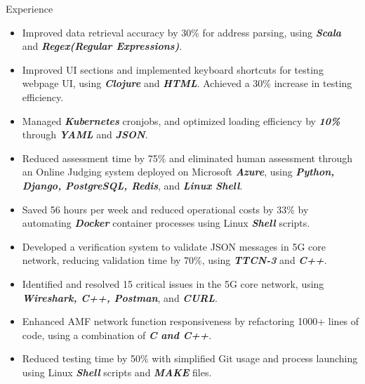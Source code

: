 \documentclass{resume} %
\begin{document}
\begin{workSection}{Experience}
\begin{itemize}
            \item Improved data retrieval accuracy by 30\% for address parsing, using \textit{\textbf{Scala}} and \textit{\textbf{Regex(Regular Expressions)}}.
            \item Improved UI sections and implemented keyboard shortcuts for testing webpage UI, using \textit{\textbf{Clojure}} and \textit{\textbf{HTML}}. Achieved a 30\% increase in testing efficiency.
            \item Managed \textit{\textbf{Kubernetes}} cronjobs, and optimized loading efficiency by \textit{\textbf{10\%}} through \textit{\textbf{YAML}} and \textit{\textbf{JSON}}.
      \end{itemize}

      \experienceItem[
      company=CodePro Education,
      location=Taichung{,} TW,
      position=Software Engineer,
      duration=Dec. 2019 – Dec. 2020
      ]
      \vspace{-0.65em}
      \begin{itemize}
            \itemsep -6pt {}
            \item Reduced assessment time by 75\% and eliminated human assessment through an Online Judging system deployed on Microsoft \textit{\textbf{Azure}}, using \textit{\textbf{Python, Django, PostgreSQL, Redis}}, and \textit{\textbf{Linux Shell}}.
            \item Saved 56 hours per week and reduced operational costs by 33\% by automating \textit{\textbf{Docker}} container processes using Linux \textit{\textbf{Shell}} scripts.
      \end{itemize}

      \experienceItem[
      company=Free5gc department of NCTU,
      location=Hsinchu{,} TW,
      position=Back End Engineer,
      duration=Jul. 2019 – Nov. 2019
      ]
      \vspace{-0.65em}
      \begin{itemize}
            \itemsep -6pt {}
            \item Developed a verification system to validate JSON messages in 5G core network, reducing validation time by 70\%, using \textit{\textbf{TTCN-3}} and \textit{\textbf{C++}}.
            \item Identified and resolved 15 critical issues in the 5G core network, using \textit{\textbf{Wireshark, C++, Postman}}, and \textit{\textbf{CURL}}.
            \item Enhanced AMF network function responsiveness by refactoring 1000+ lines of code, using a combination of \textit{\textbf{C and C++}}.
            \item Reduced testing time by 50\% with simplified Git usage and process launching using Linux \textit{\textbf{Shell}} scripts and \textit{\textbf{MAKE}} files.
      \end{itemize}


\end{workSection}
\end{document}
